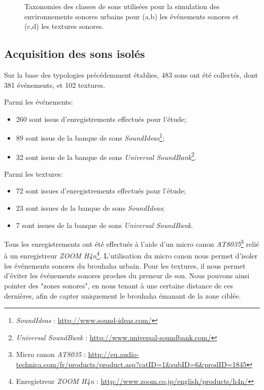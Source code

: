 \begin{figure}[t]
       \caption[Taxonomies des classes de sons utilisées pour la simulation des environnements sonores urbains.]{Taxonomies des classes de sons utilisées pour la simulation des environnements sonores urbains pour (a,b) les événements sonores et (c,d) les textures sonores.}\label{fig:taxonomie}
\end{figure}

\subsection{Acquisition des sons isolés}
\label{sec:ch5_recordDataSet}

Sur la base des typologies précédemment établies, 483 sons ont été collectés, dont 381 événements, et 102 textures.

Parmi les événements:

\begin{itemize}
\item 260 sont issus d’enregistrements effectués pour l'étude;
\item 89 sont issus de la banque de sons \emph{SoundIdeas}\footnote{\emph{SoundIdeas} : \url{ http://www.sound-ideas.com/}};
\item 32 sont issus de la banque de sons \emph{Universal SoundBank}\footnote{\emph{Universal SoundBank} : \url{http://www.universal-soundbank.com/}}.
\end{itemize}

Parmi les textures:

\begin{itemize}
\item 72 sont issues d’enregistrements effectués pour l'étude;
\item 23 sont issues de la banque de sons \emph{SoundIdeas};
\item 7 sont issues de la banque de sons \emph{Universal SoundBank}.
\end{itemize}

Tous les enregistrements ont été effectués à l’aide d'un micro canon \emph{AT8035}\footnote{Micro canon \emph{AT8035} : \url{http://eu.audio-technica.com/fr/products/product.asp?catID=1&subID=6&prodID=1845}} relié à un enregistreur \emph{ZOOM H4n}\footnote{Enregistreur \emph{ZOOM H4n} : \url{http://www.zoom.co.jp/english/products/h4n/}}. L’utilisation du micro canon nous permet d’isoler les événements sonores du brouhaha urbain. Pour les textures, il nous permet d’éviter les événements sonores proches du preneur de son. Nous pouvons ainsi pointer des "zones sonores", en nous tenant à une certaine distance de ces dernières, afin de capter uniquement le brouhaha émanant de la zone ciblée.


